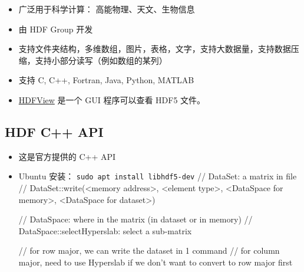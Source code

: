 

\begin{issues}
\issueDraft
\end{issues}

\begin{itemize}
\item 广泛用于科学计算： 高能物理、天文、生物信息
\item 由 HDF Group 开发
\item 支持文件夹结构，多维数组，图片，表格，文字，支持大数据量，支持数据压缩，支持小部分读写（例如数组的某列）
\item 支持 C, C++, Fortran, Java, Python, MATLAB
\item \href{https://www.hdfgroup.org/downloads/hdfview/}{HDFView} 是一个 GUI 程序可以查看 HDF5 文件。
\end{itemize}

\subsection{HDF C++ API}
\begin{itemize}
\item 这是官方提供的 C++ API
\item Ubuntu 安装： \verb|sudo apt install libhdf5-dev|
// DataSet: a matrix in file
// DataSet::write(<memory address>, <element type>, <DataSpace for memory>, <DataSpace for dataset>)

// DataSpace: where in the matrix (in dataset or in memory)
// DataSpace::selectHyperslab: select a sub-matrix

// for row major, we can write the dataset in 1 command
// for column major, need to use Hyperslab if we don't want to convert to row major first
\end{itemize}

